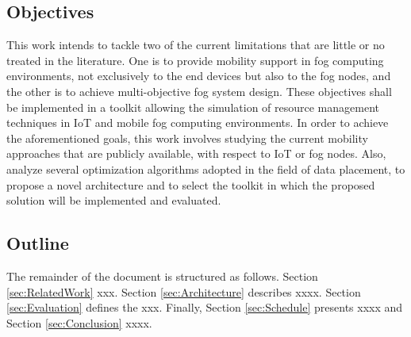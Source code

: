 \subsection{Objectives}\label{subsec:Objectives}
\noindent\tab This work intends to tackle two of the current limitations that are little or no treated in the literature. One is to provide mobility support in fog computing environments, not exclusively to the end devices but also to the fog nodes, and the other is to achieve multi-objective fog system design. These objectives shall be implemented in a toolkit allowing the simulation of resource management techniques in IoT and mobile fog computing environments. In order to achieve the aforementioned goals, this work involves studying the current mobility approaches that are publicly available, with respect to IoT or fog nodes. Also, analyze several optimization algorithms adopted in the field of data placement, to propose a novel architecture and to select the toolkit in which the proposed solution will be implemented and evaluated.
\subsection{Outline}\label{subsec:Outline}
\noindent\tab The remainder of the document is structured as follows. Section
\ref{sec:RelatedWork} xxx. Section \ref{sec:Architecture} describes xxxx.
Section \ref{sec:Evaluation} defines the xxx. Finally, Section
\ref{sec:Schedule} presents xxxx and Section \ref{sec:Conclusion} xxxx.